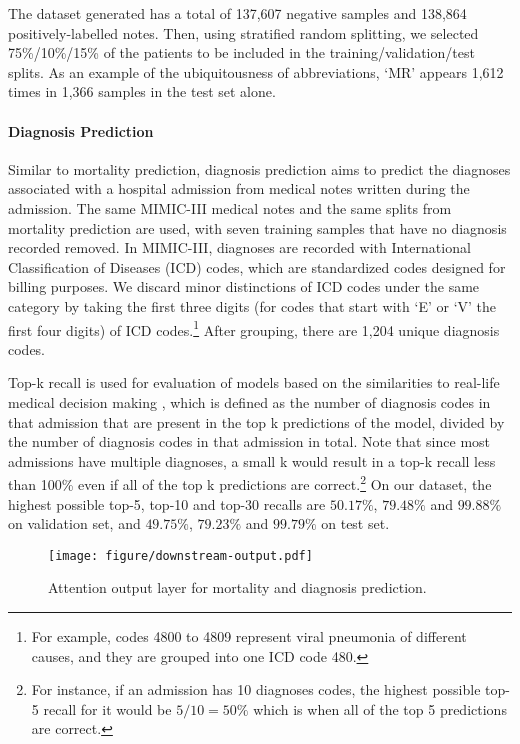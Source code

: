 \documentclass[11pt,a4paper]{article}
\begin{document}
The dataset generated has a total of 137,607 negative samples and 138,864 positively-labelled notes. Then, using stratified random splitting, we selected 75\%/10\%/15\% of the patients to be included in the training/validation/test splits. As an example of the ubiquitousness of abbreviations, `MR' appears 1,612 times in 1,366 samples in the test set alone. 

\paragraph{Diagnosis Prediction}

Similar to mortality prediction, diagnosis prediction aims to predict the diagnoses associated with a hospital admission from medical notes written during the admission. The same MIMIC-III medical notes and the same splits from mortality prediction are used, with seven training samples that have no diagnosis recorded removed. In MIMIC-III, diagnoses are recorded with International Classification of Diseases (ICD) codes, which are standardized codes designed for billing purposes. We discard minor distinctions of ICD codes under the same category by taking the first three digits (for codes that start with `E' or `V' the first four digits) of ICD codes.\footnote{For example, codes 4800 to 4809 represent viral pneumonia of different causes, and they are grouped into one ICD code 480.} After grouping, there are 1,204 unique diagnosis codes. 

Top-k recall is used for evaluation of models based on the similarities to real-life medical decision making \citep{Choi2015}, which is defined as the number of diagnosis codes in that admission that are present in the top k predictions of the model, divided by the number of diagnosis codes in that admission in total. Note that since most admissions have multiple diagnoses, a small k would result in a top-k recall less than 100\% even if all of the top k predictions are correct.\footnote{For instance, if an admission has 10 diagnoses codes, the highest possible top-5 recall for it would be $5/10=50\%$ which is when all of the top 5 predictions are correct.} On our dataset, the highest possible top-5, top-10 and top-30 recalls are $50.17\%$, $79.48\%$ and $99.88\%$ on validation set, and $49.75\%$, $79.23\%$ and $99.79\%$ on test set.

\begin{figure}[t]
    \centering
    \texttt{[image: figure/downstream-output.pdf]}
    \caption{Attention output layer for mortality and diagnosis prediction.}
    \label{fig:mimic-out}
\end{figure}
\end{document}
